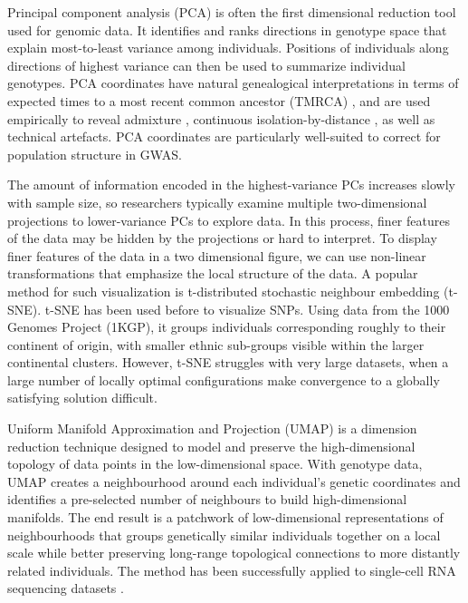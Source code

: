 Principal component analysis (PCA) is often the first dimensional reduction tool used for genomic data. It identifies and ranks directions in genotype space that explain most-to-least variance among individuals. Positions of individuals along directions of highest variance can then be used to summarize individual genotypes. PCA coordinates have natural genealogical interpretations in terms of expected times to a most recent common ancestor (TMRCA) \citep{mcvean2009genealogical}, and are used empirically to reveal admixture \citep{brisbin2012pcadmix}, continuous isolation-by-distance \citep{novembre2008europe, nelson2008population}, as well as technical artefacts. PCA coordinates are particularly well-suited to correct for population structure in GWAS\citep{eigen2006}.

The amount of information encoded in the highest-variance PCs increases slowly with sample size, so researchers typically examine multiple two-dimensional projections to lower-variance PCs to explore data. In this process, finer features of the data may be hidden by the projections or hard to interpret. To display finer features of the data in a two dimensional figure, we can use non-linear transformations that emphasize the local structure of the data. A popular method for such visualization is t-distributed stochastic neighbour embedding (t-SNE)\citep{maaten_visualizing_2008}. t-SNE has been used before to visualize SNPs\citep{platzer2013visualization}. Using data from the 1000 Genomes Project (1KGP)\citep{10002015global}, it groups individuals corresponding roughly to their continent of origin, with smaller ethnic sub-groups visible within the larger continental clusters\citep{li2017tsne}. However, t-SNE struggles with very large datasets, when a large number of locally optimal configurations make convergence to a globally satisfying solution difficult.

Uniform Manifold Approximation and Projection (UMAP) is a dimension reduction technique designed to model and preserve the high-dimensional topology of data points in the low-dimensional space\citep{2018arXivUMAP}. With genotype data, UMAP creates a neighbourhood around each individual's genetic coordinates and identifies a pre-selected number of neighbours to build high-dimensional manifolds. The end result is a patchwork of low-dimensional representations of neighbourhoods that groups genetically similar individuals together on a local scale while better preserving long-range topological connections to more distantly related individuals. The method has been successfully applied to single-cell RNA sequencing datasets \citep{umap2018singlecell}.

